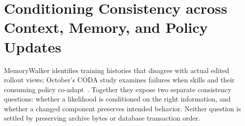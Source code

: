 \chapter{Conditioning Consistency across Context, Memory, and Policy Updates}\label{ch:C17}

MemoryWalker identifies training histories that disagree with actual edited rollout views; October's CODA study examines failures when skills and their consuming policy co-adapt~\cite{j2026memorywalker,feng2026coda}. Together they expose two separate consistency questions: whether a likelihood is conditioned on the right information, and whether a changed component preserves intended behavior. Neither question is settled by preserving archive bytes or database transaction order.









